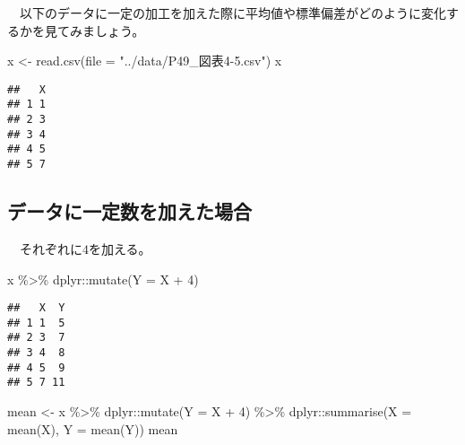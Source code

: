 \documentclass[
  12pt,
]{book}
\newenvironment{Shaded}{\begin{snugshade}}{\end{snugshade}}
\newcommand{\AttributeTok}[1]{\textcolor[rgb]{0.77,0.63,0.00}{#1}}
\newcommand{\DecValTok}[1]{\textcolor[rgb]{0.00,0.00,0.81}{#1}}
\newcommand{\FunctionTok}[1]{\textcolor[rgb]{0.00,0.00,0.00}{#1}}
\newcommand{\NormalTok}[1]{#1}
\newcommand{\OtherTok}[1]{\textcolor[rgb]{0.56,0.35,0.01}{#1}}
\newcommand{\SpecialCharTok}[1]{\textcolor[rgb]{0.00,0.00,0.00}{#1}}
\newcommand{\StringTok}[1]{\textcolor[rgb]{0.31,0.60,0.02}{#1}}
\begin{document}
　以下のデータに一定の加工を加えた際に平均値や標準偏差がどのように変化するかを見てみましょう。

\begin{Shaded}
\begin{Highlighting}[]
\NormalTok{x }\OtherTok{\textless{}{-}} \FunctionTok{read.csv}\NormalTok{(}\AttributeTok{file =} \StringTok{"../data/P49\_図表4{-}5.csv"}\NormalTok{)}
\NormalTok{x}
\end{Highlighting}
\end{Shaded}

\begin{verbatim}
##   X
## 1 1
## 2 3
## 3 4
## 4 5
## 5 7
\end{verbatim}

\hypertarget{ux30c7ux30fcux30bfux306bux4e00ux5b9aux6570ux3092ux52a0ux3048ux305fux5834ux5408}{%
\subsection*{データに一定数を加えた場合}\label{ux30c7ux30fcux30bfux306bux4e00ux5b9aux6570ux3092ux52a0ux3048ux305fux5834ux5408}}

　それぞれに\(4\)を加える。

\begin{Shaded}
\begin{Highlighting}[]
\NormalTok{x }\SpecialCharTok{\%\textgreater{}\%} 
\NormalTok{  dplyr}\SpecialCharTok{::}\FunctionTok{mutate}\NormalTok{(}\AttributeTok{Y =}\NormalTok{ X }\SpecialCharTok{+} \DecValTok{4}\NormalTok{)}
\end{Highlighting}
\end{Shaded}

\begin{verbatim}
##   X  Y
## 1 1  5
## 2 3  7
## 3 4  8
## 4 5  9
## 5 7 11
\end{verbatim}

\begin{Shaded}
\begin{Highlighting}[]
\NormalTok{mean }\OtherTok{\textless{}{-}}\NormalTok{ x }\SpecialCharTok{\%\textgreater{}\%} 
\NormalTok{  dplyr}\SpecialCharTok{::}\FunctionTok{mutate}\NormalTok{(}\AttributeTok{Y =}\NormalTok{ X }\SpecialCharTok{+} \DecValTok{4}\NormalTok{) }\SpecialCharTok{\%\textgreater{}\%} 
\NormalTok{  dplyr}\SpecialCharTok{::}\FunctionTok{summarise}\NormalTok{(}\AttributeTok{X =} \FunctionTok{mean}\NormalTok{(X), }\AttributeTok{Y =} \FunctionTok{mean}\NormalTok{(Y))}
\NormalTok{mean}
\end{Highlighting}
\end{Shaded}
\end{document}
